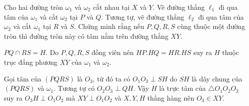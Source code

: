 \begin{prob}[USAMO 2009/1]
	Cho hai đường tròn $\omega_1$ và $\omega_2$ cắt nhau tại $X$ và $Y$. Vẽ đường thẳng $\ell_1$ đi qua tâm của $\omega_1$ và cắt $\omega_2$ tại $P$ và $Q$. Tương tự, vẽ đường thẳng $\ell_2$ đi qua tâm của $\omega_2$ và cắt $\omega_1$ tại $R$ và $S$. Chứng minh rằng nếu $P, Q, R, S$ cùng thuộc một đường tròn thì đường tròn này có tâm nằm trên đường thẳng $XY$.
\end{prob}

\begin{center}

\end{center}

$PQ \cap RS = {H}$. Do $P, Q, R, S$ đồng viên nên $HP.HQ = HR.HS$ suy ra $H$ thuộc trục đẳng phương $XY$ của $\omega_1$ và $\omega_2$.

Gọi tâm của $(PQRS)$ là $O_3$, từ đó ta có $O_1O_3 \perp SH$ do $SH$ là dây chung của $(PQRS)$ và $\omega_1$. Tương tự có $O_2O_3 \perp QH$. Vậy $H$ là trực tâm của $\triangle O_1O_2O_3$ suy ra $O_3H \perp O_1O_2$ mà $XY \perp O_1O_2$ và $X, Y, H$ thẳng hàng nên $O_3 \in XY$.